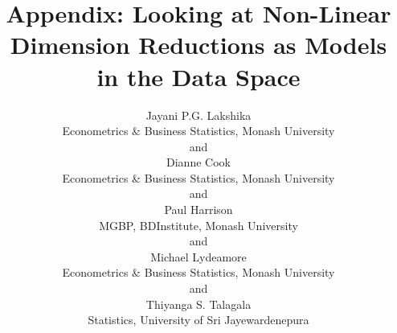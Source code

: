 \documentclass[
  12pt]{article}
\begin{document}
\def\spacingset#1{\renewcommand{\baselinestretch}%
{#1}\small\normalsize} \spacingset{1}



\title{\bf Appendix: Looking at Non-Linear Dimension Reductions as
Models in the Data Space}
\author{
Jayani P.G. Lakshika\\
Econometrics \& Business Statistics, Monash University\\
and\\Dianne Cook\\
Econometrics \& Business Statistics, Monash University\\
and\\Paul Harrison\\
MGBP, BDInstitute, Monash University\\
and\\Michael Lydeamore\\
Econometrics \& Business Statistics, Monash University\\
and\\Thiyanga S. Talagala\\
Statistics, University of Sri Jayewardenepura\\
}
\maketitle

\bigskip
\bigskip
\begin{abstract}

\end{abstract}


\newpage
\spacingset{1.9} %
\end{document}
